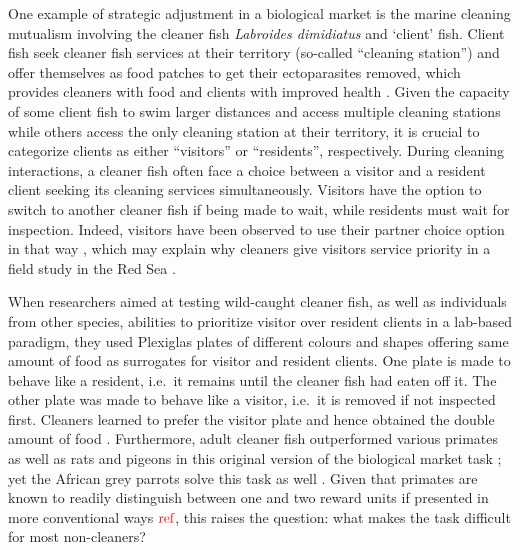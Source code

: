\documentclass[]{rsos}%
\begin{document}
One example of strategic adjustment in a biological market is the marine
cleaning mutualism involving the cleaner fish \emph{Labroides dimidiatus} and
`client' fish. Client fish seek cleaner fish services at their territory
(so-called ``cleaning station'') and offer themselves as food patches
to get their ectoparasites removed, which provides cleaners
with food and clients with improved health \citep{waldie_LongTerm_2011, ros_Does_2011, triki_Effects_2016, demaire_Reduced_2020}.
Given the capacity of some client fish to swim larger distances and
access multiple cleaning stations while others access the only cleaning
station at their territory, it is crucial to categorize clients as
either ``visitors'' or ``residents'', respectively. During cleaning interactions,
a cleaner fish often face a choice between a visitor and a resident client
seeking its cleaning services simultaneously. Visitors have the option
to switch to another cleaner fish if being made to wait, while residents
must wait for inspection. Indeed,
visitors have been observed to use their partner choice option in that
way \citep{bshary_Choosy_2002}, which may explain why cleaners give
visitors service priority in a field study in the Red Sea
\citep{bshary_Cleaner_2001a}.

When researchers aimed at testing wild-caught cleaner fish, as
well as individuals from other species, abilities
to prioritize visitor over resident clients in a lab-based paradigm,
they used Plexiglas plates of different colours and shapes offering same
amount of food as surrogates for visitor and resident clients.
One plate is made to behave like a resident, i.e.~it remains until
the cleaner fish had eaten off it. The other plate was made to behave
like a visitor, i.e.~it is removed if not inspected first.
Cleaners learned to prefer the visitor plate and
hence obtained the double amount of food \citep{bshary_Asymmetric_2002}.
Furthermore, adult cleaner fish outperformed various primates as well as rats and
pigeons in this original version of the biological market task
\citep{salwiczek_Adult_2012, zentall_Early_2017}; yet the African grey
parrots solve this task as well \citep{pepperberg_Can_2014}. Given that primates
are known to readily distinguish
between one and two reward units if presented in more conventional ways
\(\color{red}{\text{ref}}\), this raises the question:
what makes the task difficult for most non-cleaners?
\end{document}
